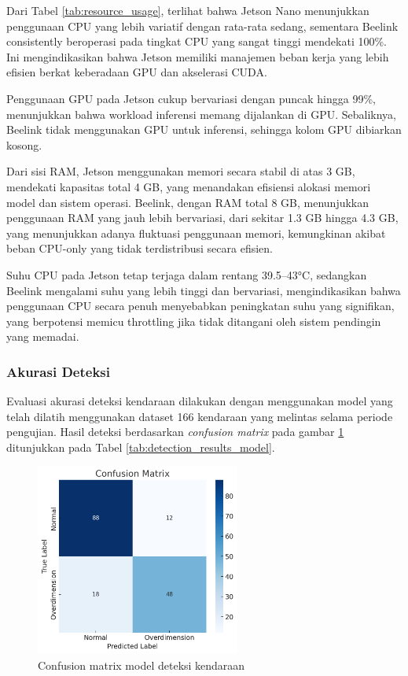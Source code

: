 Dari Tabel \ref{tab:resource_usage}, terlihat bahwa Jetson Nano menunjukkan penggunaan CPU yang lebih variatif dengan rata-rata sedang, sementara Beelink consistently beroperasi pada tingkat CPU yang sangat tinggi mendekati 100\%. Ini mengindikasikan bahwa Jetson memiliki manajemen beban kerja yang lebih efisien berkat keberadaan GPU dan akselerasi CUDA.

Penggunaan GPU pada Jetson cukup bervariasi dengan puncak hingga 99\%, menunjukkan bahwa workload inferensi memang dijalankan di GPU. Sebaliknya, Beelink tidak menggunakan GPU untuk inferensi, sehingga kolom GPU dibiarkan kosong.

Dari sisi RAM, Jetson menggunakan memori secara stabil di atas 3 GB, mendekati kapasitas total 4 GB, yang menandakan efisiensi alokasi memori model dan sistem operasi. Beelink, dengan RAM total 8 GB, menunjukkan penggunaan RAM yang jauh lebih bervariasi, dari sekitar 1.3 GB hingga 4.3 GB, yang menunjukkan adanya fluktuasi penggunaan memori, kemungkinan akibat beban CPU-only yang tidak terdistribusi secara efisien.

Suhu CPU pada Jetson tetap terjaga dalam rentang 39.5--43°C, sedangkan Beelink mengalami suhu yang lebih tinggi dan bervariasi, mengindikasikan bahwa penggunaan CPU secara penuh menyebabkan peningkatan suhu yang signifikan, yang berpotensi memicu throttling jika tidak ditangani oleh sistem pendingin yang memadai.


\subsubsection{Akurasi Deteksi}

Evaluasi akurasi deteksi kendaraan dilakukan dengan menggunakan model yang telah dilatih menggunakan dataset 166 kendaraan yang melintas selama periode pengujian. Hasil deteksi berdasarkan \emph{confusion matrix} pada gambar \ref{fig:confusion_matrix_model} ditunjukkan pada Tabel \ref{tab:detection_results_model}.

\begin{figure}[htbp]
  \centering
  \includegraphics[width=0.6\textwidth]{gambar/bab4-confusion-matrix.png}
  \caption{Confusion matrix model deteksi kendaraan}
  \label{fig:confusion_matrix_model}
\end{figure}

